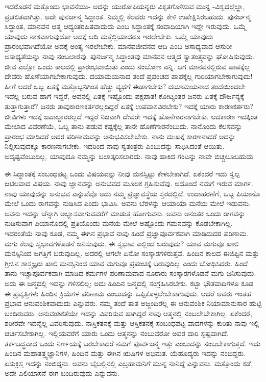 ಇದರೊಡನೆ ಮತ್ತೊಂದು ಭಾವನೆಯು- ಅದನ್ನು ಯುರೋಪಿಯನ್ನರು ವಿಕೃತಗೊಳಿಸುವ ಮುನ್ನ -ವಿಶ್ವದಲ್ಲೆಲ್ಲಾ, ಪ್ರಚಲಿತವಾಗಿತ್ತು. ಅದೇ ಪುನರ್ಜನ್ಮ ಸಿದ್ದಾಂತ. ನಿಮ್ಮಲ್ಲಿ ಕೆಲವರು ಇದನ್ನು ಕೇಳಿ ಉಪೇಕ್ಷಿಸಿರಬಹುದು. ಪುನರ್ಜನ್ಮ ಸಿದ್ಧಾಂತ, ಮಾನವನ ಆತ್ಮ ಆದ್ಯಂತರಹಿತವಾದುದು ಎಂಬ ಸಿದ್ಧಾಂತಕ್ಕೆ ಸಂವಾದಿಯಾಗಿ ಇದ್ದೇ ಇರುವುದು. ಒಮ್ಮೆ ಯಾವುದು ನಾಶವಾಗುವುದೋ ಅದಕ್ಕೆ ಆದಿ ಮತ್ತೆಲ್ಲಿಯಾದರೂ ಇರಲೇಬೇಕು. ಒಮ್ಮೆ ಯಾವುದು ಪ್ರಾರಂಭವಾಗಿದೆಯೋ ಅದಕ್ಕೆ ಅಂತ್ಯ ಇರಲೇಬೇಕು. ಮಾನವಜೀವನದ ಆದಿ ಎಂಬ ಅಸಾಧ್ಯವಾದ ಆಸುರೀ ಅಸಾಧ್ಯತೆಯನ್ನು ನಾವು ನಂಬಲಾರೆವು. ಪುನರ್ಜನ್ಮ ಸಿದ್ಧಾಂತವು ಮಾನವನ ಆತ್ಮದ ಸ್ವಾತಂತ್ರ್ಯವನ್ನು ಘೋಷಿಸುವುದು. ಜೀವ ಎಲ್ಲೋ ಒಂದು ಕಾಲದಲ್ಲಿ ಪ್ರಾರಂಭವಾಯಿತು ಎಂದು ನಂಬೋಣ ಎನ್ನಿ. ಆಗ ಮಾನವನಲ್ಲಿರುವ ಪಾಪಕ್ಕೆಲ್ಲ ದೇವರು ಹೊಣೆಯಾಗಬೇಕಾಗುವುದು. ದಯಾಮಯನಾದ ತಂದೆ ಪ್ರಪಂಚದ ಪಾಪಕ್ಕೆಲ್ಲ ಗುರಿಯಾಗಬೇಕಾಗುವುದು! ಹೀಗೆ ಆದರೆ ಒಬ್ಬ ಏತಕ್ಕೆ ಮತ್ತೊಬ್ಬನಿಗಿಂತ ಹೆಚ್ಚು ವ್ಯಥೆಗೆ ಈಡಾಗಬೇಕು? ದಯಾಮಯನಾದ ತಂದೆಯಿಂದಲೇ ಇದೆಲ್ಲ ಬರುವ ಹಾಗೆ ಇದ್ದರೆ, ಅವನಲ್ಲಿ ಏತಕ್ಕೆ ಇಷ್ಟೊಂದು ಪಕ್ಷಪಾತ! ಕೋಟ್ಯಂತರ ಜನರು ಏತಕ್ಕೆ ದೌರ್ಜನ್ಯಕ್ಕೆ ತುತ್ತಾಗುತ್ತಾರೆ? ಜನರು ತಾವು\break ಕಾರಣಕರ್ತರಲ್ಲದಿದ್ದರೆ ಏತಕ್ಕೆ ಉಪವಾಸವಿರಬೇಕು? ಇದಕ್ಕೆ ಯಾರು ಕಾರಣಕರ್ತರು? ಜೀವಿಗಳು ಇದಕ್ಕೆ ಜವಾಬ್ದಾರರಲ್ಲದೆ ಇದ್ದರೆ ನಿಜವಾಗಿ ದೇವರೇ ಇದಕ್ಕೆ ಹೊಣೆಗಾರನಾಗಬೇಕು. ಆದಕಾರಣ ಇದಕ್ಕಿಂತ ಮೇಲಾದ ವಿವರಣೆಯೆ, ಒಬ್ಬ ತಾನು ಪಡುವ ಕಷ್ಟಕ್ಕೆಲ್ಲ ತಾನೇ ಹೊಣೆಗಾರನೆಂಬುದು. ನಾನೊಂದು ಕೆಲಸವನ್ನು ಪ್ರಾರಂಭ ಮಾಡಿದರೆ ಅದರ ಪರಿಣಾಮವನ್ನು ಅನುಭವಿಸಲೇಬೇಕು. ನಾನು ದುಃಖಕ್ಕೆ ಕಾರಣನಾದರೆ ಅದನ್ನು ನಿಲ್ಲಿಸುವುದಕ್ಕೂ ಕಾರಣನಾಗಬೇಕು. ಇದರಿಂದ ನಾವು ಸ್ವತಂತ್ರರು ಎಂಬುದನ್ನು ಸಾಧಿಸಿದಂತೆ ಆಯಿತು. ಅದೃಷ್ಟವೆಂಬುದಿಲ್ಲ. ಯಾವುದೂ ನಮ್ಮನ್ನು ಬಲಾತ್ಕರಿಸಲಾರದು. ನಾವು ಹಾಕಿದ ಗಂಟನ್ನು ನಾವೇ ಬಿಚ್ಚಲೂಬಹುದು.

ಈ ಸಿದ್ಧಾಂತಕ್ಕೆ ಸಂಬಂಧಪಟ್ಟ ಒಂದು ವಿಷಯವನ್ನು ನೀವು ಮನಸ್ಸಿಟ್ಟು ಕೇಳಬೇಕಾಗಿದೆ. ಏಕೆಂದರೆ ಇದು ಸ್ವಲ್ಪ ಜಟಿಲವಾದ ವಿಷಯ. ನಾವು ಜ್ಞಾನವನ್ನು ಅನುಭವದ ಮೂಲಕ ಗ್ರಹಿಸುವೆವು. ಅದೊಂದೆ ನಮಗೆ ಇರುವ ಮಾರ್ಗ. ನಾವು ಯಾವುದನ್ನು ಅನುಭವ ಎನ್ನುವೆವೊ ಅದು ನಮ್ಮ ಪ್ರಜ್ಞಾವಸ್ಥೆಯ ಸ್ತರದಲ್ಲಿದೆ. ಉದಾಹರಣೆಗೆ, ಒಬ್ಬ ಪಿಯಾನೊ ಮೇಲೆ ಒಂದು ರಾಗವನ್ನು ನುಡಿಸಿದ ಎಂದು ಭಾವಿಸಿ. ಅವನು ಬೆರಳನ್ನು ಆಯಾಯಾ ಮನೆಯ ಮೇಲೆ ಇಡುವನು. ಅವನು ಇದನ್ನು ಚೆನ್ನಾಗಿ ಅಭ್ಯಾಸವಾಗುವವರೆಗೆ ಮಾಡುತ್ತ ಹೋಗುವನು. ಅವನು ಅನಂತರ ಒಂದು ರಾಗವನ್ನು ನುಡಿಸುವಾಗ ಪಿಯಾನೊದಲ್ಲಿ ಪ್ರತಿಯೊಂದು ಮನೆಯ ಮೇಲೆ ಅಷ್ಟೊಂದು ಗಮನವನ್ನು ಕೊಡಬೇಕಾಗಿಲ್ಲ. ಇದರಂತೆಯೆ ನಾವು ಕೂಡ, ನಮ್ಮ ಈಗಿನ ಪ್ರಭಾವ ನಾವು ಹಿಂದೆ ಪ್ರಜ್ಞಾಪೂರ್ವಕವಾಗಿ ಮಾಡಿದುದರ ಪರಿಣಾಮ. ಮಗು ಕೆಲವು ಸ್ವಭಾವಗಳೊಡನೆ ಜನಿಸುವುದು. ಈ ಸ್ವಭಾವ ಎಲ್ಲಿಂದ ಬರುವುದು? ಯಾವ ಮಗುವೂ ಖಾಲಿ ಮನಸ್ಸಿನಿಂದ ಜಗತ್ತಿಗೆ ಬರುವುದಿಲ್ಲ. ಅದರಲ್ಲಿ ಆಗಲೇ ಏನೋ ಸಂಸ್ಕಾರಗಳಿರುತ್ತವೆ. ಹಿಂದಿನ ಕಾಲದ ಈಜಿಪ್ಟಿನ ಮತ್ತು ಗ್ರೀಸಿನ ಶಾಸ್ತ್ರಜ್ಞರು ಖಾಲಿ ಮನಸ್ಸಿನಿಂದ ಯಾವ ಮಗುವೂ ಪ್ರಪಂಚಕ್ಕೆ ಬರುವುದಿಲ್ಲ ಎಂದು ಬೋಧಿಸಿದರು. ಹಿಂದೆ ತಾನು ಇಚ್ಚಾಪೂರ್ವಕವಾಗಿ ಮಾಡಿದ ಕರ್ಮಗಳ ಪರಿಣಾಮವಾದ ನೂರಾರು ಸಂಸ್ಕಾರಗಳೊಡನೆ ಮಗು ಜನಿಸುವುದು. ಅದು ಈ ಜನ್ಮದಲ್ಲಿ ಇದನ್ನು ಗಳಿಸಲಿಲ್ಲ; ಅದು ಹಿಂದಿನ ಜನ್ಮದಲ್ಲಿ ಸಂಗ್ರಹಿಸಿರಬೇಕು. ಕಟ್ಟಾ ಭೌತವಾದಿಗಳೂ ಕೂಡ ಈ ಪ್ರವೃತ್ತಿಗಳು ಹಿಂದಿನ ಕ್ರಿಯೆಗಳ ಪರಿಣಾಮ ಎಂಬುದನ್ನು ಒಪ್ಪಿಕೊಳ್ಳಲೇಬೇಕಾಗುವುದು. ಆದರೆ ಅವರು ಇಂತಹ ಪ್ರಭಾವ ಆನುವಂಶಿಕವಾದುದು ಎನ್ನುವರು. ನಮ್ಮ ತಂದೆ ತಾತ ಅಜ್ಜಂದಿರೆಲ್ಲ ಈ ಆನುವಂಶಿಕ ನಿಯಾಮಾನುಸಾರ ಹುಟ್ಟಿ ಬಂದಿರುವರು. ಆನುವಂಶಿಕತೆಯೇ ಇದನ್ನು ವಿವರಿಸುವ ಹಾಗಿದ್ದರೆ ನಾವು ಆತ್ಮನಲ್ಲಿ ನಂಬಲೇಬೇಕಾಗಿಲ್ಲ. ಏಕೆಂದರೆ, ಶರೀರವೇ ಇದನ್ನೆಲ್ಲ ವಿವರಿಸುವುದು. ನಾಸ್ತಿಕತನಕ್ಕೆ ಮತ್ತು ಆಸ್ತಿಕತನಕ್ಕೆ ಸಂಬಂಧಪಟ್ಟ ವಾದಗಳನ್ನು ಕುರಿತು ನಾವು ಇಲ್ಲಿ ಚರ್ಚಿಸಬೇಕಾಗಿಲ್ಲ. ಇಲ್ಲಿಯವರೆಗೆ ಯಾರು ಒಂದು ಆತ್ಮನನ್ನು ನಂಬುವರೋ ಅವರ ದಾರಿ ಸ್ಪಷ್ಟವಾಗಿದೆ. ತರ್ಕಬದ್ಧವಾದ ಒಂದು ನಿರ್ಣಯಕ್ಕೆ ಬರಬೇಕಾದರೆ ನಮಗೆ ಪೂರ್ವಜನ್ಮ ಇತ್ತು ಎಂಬುದನ್ನು ನಂಬಬೇಕಾಗುತ್ತದೆ. ಇದು ಹಿಂದಿನ ಮಹಾತತ್ತ್ವಜ್ಞಾನಿಗಳ, ಹಿಂದಿನ ಮತ್ತು ಈಗಿನ ಋಷಿಗಳ ಅಭಿಮತ. ಯೆಹೂದ್ಯರು ಇದನ್ನು ನಂಬಿದ್ದರು. ಏಸುಕ್ರಿಸ್ತ ಇದನ್ನು ನಂಬಿದ್ದನು. ಅವನು ಬೈಬಲ್ಲಿನಲ್ಲಿ ಎಬ್ರಹಾಮನಿಗೆ ಮುನ್ನ ನಾನಿದ್ದೆ ಎನ್ನುವನು. ಮತ್ತೊಂದು ಕಡೆ, ಅದೇ ಎಲಿಯಾಸನೆ ಈಗ ಬಂದಿರುವುದು ಎನ್ನುವನು.

